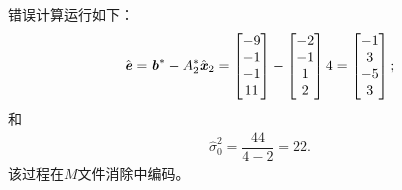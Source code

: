  错误计算运行如下：
 \begin{align*}
 \hat{\textbf{\textit{e}}} = \textbf{\textit{b}}^{*} -A^{*}_{2} \hat{\textbf{\textit{x}}}_{2} =
 \begin{bmatrix}
 -9 \\
 -1 \\
 -1 \\
 11 
 \end{bmatrix} -
 \begin{bmatrix}
 -2 \\
 -1 \\
 1 \\
 2 
 \end{bmatrix}4 = 
 \begin{bmatrix}
 -1 \\
 3 \\
 -5 \\
 3 
 \end{bmatrix};
 \end{align*}
 和
 \begin{align*}
 \hat{\sigma}^{2}_{0} = \dfrac{44}{4-2} = 22 .
 \end{align*} 
 该过程在$M$文件消除中编码。